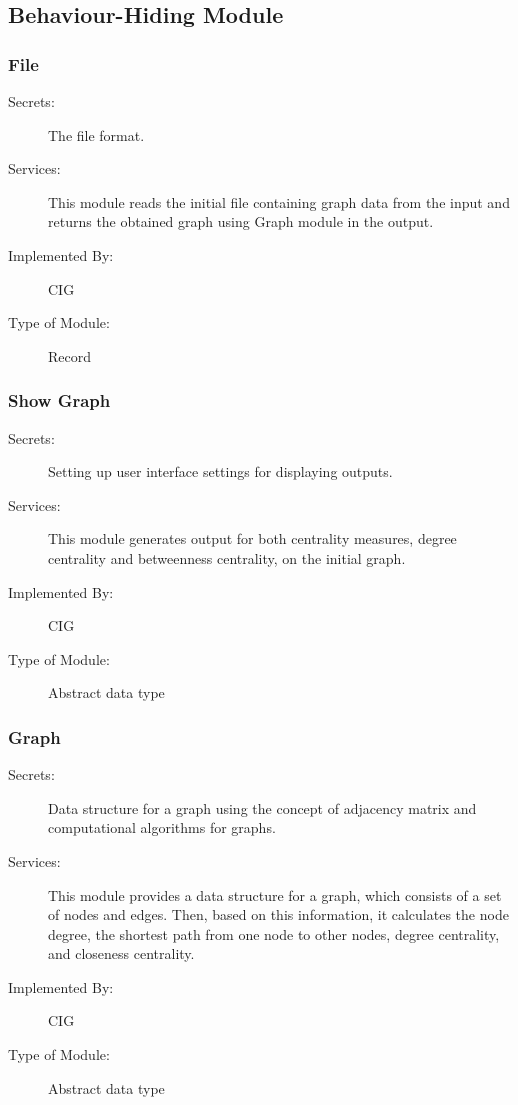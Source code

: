 \documentclass[12pt, titlepage]{article}
\begin{document}
\subsection{Behaviour-Hiding Module}



\subsubsection{File }

\begin{description}
\item[Secrets:] The file format.
\item[Services:] This module reads the initial file containing graph data from the input and returns the obtained graph using Graph module in the output.
\item[Implemented By:] CIG
\item[Type of Module:] Record
\end{description}

\subsubsection{Show Graph }
\begin{description}
\item[Secrets:] Setting up user interface settings for displaying outputs.
\item[Services:] This module generates output for both centrality measures, degree centrality and betweenness centrality, on the initial graph.
\item[Implemented By:] CIG
\item[Type of Module:] Abstract data type
\end{description}

\subsubsection{Graph }
\begin{description}
\item[Secrets:] Data structure for a graph using the concept of adjacency matrix and computational algorithms for graphs.
\item[Services:] This module provides a data structure for a graph, which consists of a set of nodes and edges. Then, based on this information, it calculates the node degree, the shortest path from one node to other nodes, degree centrality, and closeness centrality.
\item[Implemented By:] CIG
\item[Type of Module:] Abstract data type
\end{description}
\end{document}
